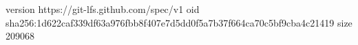 version https://git-lfs.github.com/spec/v1
oid sha256:1d622caf339df63a976fbb8f407e7d5dd0f5a7b37f664ca70c5bf9cba4c21419
size 209068
